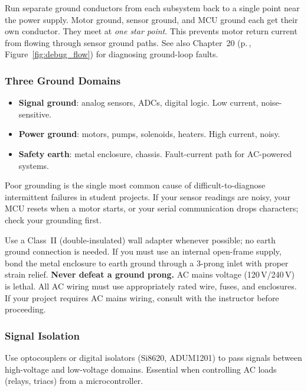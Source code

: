 \documentclass[11pt,letterpaper,twoside,openany]{book}
\begin{document}
\begin{keyconceptbox}
Run separate ground conductors from each subsystem back to a single point near the power supply. Motor ground, sensor ground, and MCU ground each get their own conductor. They meet at \emph{one star point}. This prevents motor return current from flowing through sensor ground paths. See also Chapter~20 (p.\,\pageref{ch:debug}, Figure~\ref{fig:debug_flow}) for diagnosing ground-loop faults.
\end{keyconceptbox}

\subsubsection{Three Ground Domains}
\begin{itemize}[nosep,leftmargin=1.5em]
  \item \textbf{Signal ground}: analog sensors, ADCs, digital logic. Low current, noise-sensitive.
  \item \textbf{Power ground}: motors, pumps, solenoids, heaters. High current, noisy.
  \item \textbf{Safety earth}: metal enclosure, chassis. Fault-current path for AC-powered systems.
\end{itemize}

\begin{warningbox}
Poor grounding is the single most common cause of difficult-to-diagnose intermittent failures in student projects. If your sensor readings are noisy, your MCU resets when a motor starts, or your serial communication drops characters; check your grounding first.
\end{warningbox}

\begin{warningbox}
Use a Class~II (double-insulated) wall adapter whenever possible; no earth ground connection is needed. If you must use an internal open-frame supply, bond the metal enclosure to earth ground through a 3-prong inlet with proper strain relief. \textbf{Never defeat a ground prong.} AC mains voltage (120\,V/240\,V) is lethal. All AC wiring must use appropriately rated wire, fuses, and enclosures. If your project requires AC mains wiring, consult with the instructor before proceeding.
\end{warningbox}

\subsubsection{Signal Isolation}
Use optocouplers or digital isolators (Si8620, ADUM1201) to pass signals between high-voltage and low-voltage domains. Essential when controlling AC loads (relays, triacs) from a microcontroller.
\end{document}
